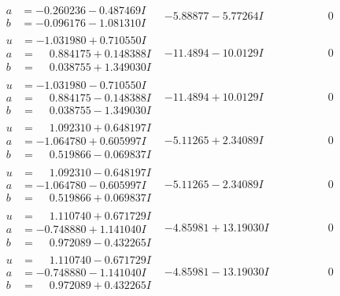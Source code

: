 \documentclass[1p]{elsarticle_modified}
\theoremstyle{definition}
\begin{document}
$$\begin{array}{c|c|c}
\begin{aligned}
a &= -0.260236 - 0.487469 I \\
b &= -0.096176 - 1.081310 I\end{aligned}
 & -5.88877 - 5.77264 I & \phantom{-0.000000 } 0 \\ \hline\begin{aligned}
u &= -1.031980 + 0.710550 I \\
a &= \phantom{-}0.884175 + 0.148388 I \\
b &= \phantom{-}0.038755 + 1.349030 I\end{aligned}
 & -11.4894 - 10.0129 I & \phantom{-0.000000 } 0 \\ \hline\begin{aligned}
u &= -1.031980 - 0.710550 I \\
a &= \phantom{-}0.884175 - 0.148388 I \\
b &= \phantom{-}0.038755 - 1.349030 I\end{aligned}
 & -11.4894 + 10.0129 I & \phantom{-0.000000 } 0 \\ \hline\begin{aligned}
u &= \phantom{-}1.092310 + 0.648197 I \\
a &= -1.064780 + 0.605997 I \\
b &= \phantom{-}0.519866 - 0.069837 I\end{aligned}
 & -5.11265 + 2.34089 I & \phantom{-0.000000 } 0 \\ \hline\begin{aligned}
u &= \phantom{-}1.092310 - 0.648197 I \\
a &= -1.064780 - 0.605997 I \\
b &= \phantom{-}0.519866 + 0.069837 I\end{aligned}
 & -5.11265 - 2.34089 I & \phantom{-0.000000 } 0 \\ \hline\begin{aligned}
u &= \phantom{-}1.110740 + 0.671729 I \\
a &= -0.748880 + 1.141040 I \\
b &= \phantom{-}0.972089 - 0.432265 I\end{aligned}
 & -4.85981 + 13.19030 I & \phantom{-0.000000 } 0 \\ \hline\begin{aligned}
u &= \phantom{-}1.110740 - 0.671729 I \\
a &= -0.748880 - 1.141040 I \\
b &= \phantom{-}0.972089 + 0.432265 I\end{aligned}
 & -4.85981 - 13.19030 I & \phantom{-0.000000 } 0 \\ \hline\begin{aligned}

\end{aligned}
\end{array}$$
\end{document}
